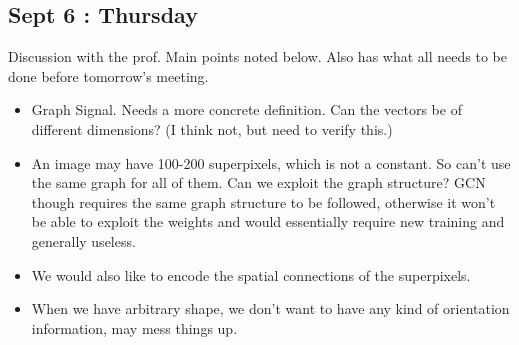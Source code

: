 \documentclass{article}
\begin{document}
\subsection{Sept 6 : Thursday}
Discussion with the prof. Main points noted below. Also has what all needs to be done before tomorrow's meeting.
\begin{itemize}
\item Graph Signal. Needs a more concrete definition. Can the vectors be of different dimensions? (I think not, but need to verify this.)
\item An image may have 100-200 superpixels, which is not a constant. So can't use the same graph for all of them. Can we exploit the graph structure? GCN though requires the same graph structure to be followed, otherwise it won't be able to exploit the weights and would essentially require new training and generally useless.
\item We would also like to encode the spatial connections of the superpixels.
\item When we have arbitrary shape, we don't want to have any kind of orientation information, may mess things up.
\end{itemize}




\end{document}
